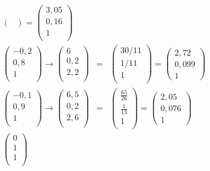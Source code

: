\documentclass[11pt]{article}
\begin{document}
\begin{enumerate}
\begin{eqnarray*}
\begin{pmatrix}
\end{pmatrix}
=
\begin{pmatrix}
3,05 \\ 0,16 \\ 1 \\ 
\end{pmatrix}
\\
\begin{pmatrix}
-0,2 \\ 0,8 \\ 1 \\
\end{pmatrix}
\rightarrow
\begin{pmatrix}
6 \\ 0,2 \\ 2,2 \\
\end{pmatrix}
&=&
\begin{pmatrix}
30/11 \\ 1/11 \\ 1 \\
\end{pmatrix}
=
\begin{pmatrix}
2,72 \\ 0,099 \\ 1
\end{pmatrix}
\\
\begin{pmatrix}
-0,1 \\ 0,9 \\ 1 \\
\end{pmatrix}
\rightarrow
\begin{pmatrix}
6,5 \\ 0,2 \\ 2,6 \\
\end{pmatrix}
&=&
\begin{pmatrix}
\frac{65}{26} \\ \frac{1}{13} \\ 1 \\
\end{pmatrix}
=
\begin{pmatrix}
2,05 \\ 0,076 \\ 1
\end{pmatrix}
\\
\begin{pmatrix}
0 \\ 1 \\ 1 \\

\end{pmatrix}
\end{eqnarray*}
\end{enumerate}
\end{document}
